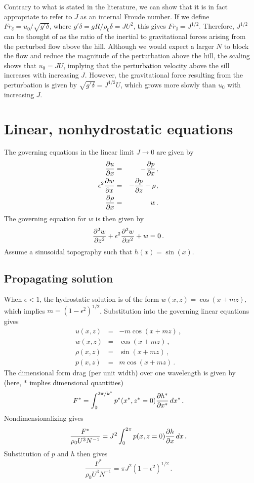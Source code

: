 \documentclass[12pt]{article}
\begin{document}
Contrary to what is stated in the literature, we can show that it is
in fact appropriate to refer to $J$ as an internal Froude number. If we define
$Fr_\delta = u_0/\sqrt{g' \delta}$, where $g'\delta =g R/\rho_0 \delta = J U^2$, this gives
$Fr_{\delta} = J^{1/2}$. Therefore, $J^{1/2}$ can be thought of as 
the ratio of the inertial to gravitational forces arising from the perturbed
flow above the hill. Although we would expect a larger $N$ to block the flow and
reduce the magnitude of the perturbation above the hill, the scaling shows that
$u_0 = J U$, implying that the perturbation velocity above the sill increases with
increasing $J$. However, the gravitational force resulting from the perturbation is
given by $\sqrt{g'\delta} = J^{1/2} U$, which grows more slowly than $u_0$ with
increasing $J$.

\section{Linear, nonhydrostatic equations}

The governing equations in the linear limit $J\to 0$ are given by
\begin{eqnarray*}
\frac{\partial{u}}{\partial{x}} &=& -\frac{\partial{p}}{\partial{x}}\,,\\
\epsilon^2 \frac{\partial{w}}{\partial{x}} &=& -\frac{\partial{p}}{\partial{z}} - \rho\,,\\
\frac{\partial{\rho}}{\partial{x}} &=& w\,.
\end{eqnarray*}
The governing equation for $w$ is then given by
\[ 
\frac{\partial^{2}{w}}{\partial{z}^{2}} + \epsilon^2 \frac{\partial^{2}{w}}{\partial{x}^{2}} + w = 0\,.
\]
Assume a sinusoidal topography such that $h(x) = \sin(x)$.

\subsection{Propagating solution}

When $\epsilon<1$, the hydrostatic solution is of the form
$w(x,z) = \cos(x + m z)$, which implies $m = (1-\epsilon^2)^{1/2}$.  Substitution into
the governing linear equations gives
\begin{eqnarray*}
u(x,z) &=& -m \cos(x + m z)\,,\\
w(x,z) &=& \cos(x + m z)\,,\\
\rho(x,z) &=& \sin(x + m z)\,,\\
p(x,z) &=& m \cos(x + m z)\,.
\end{eqnarray*}
The dimensional form drag (per unit width) over one wavelength is given by (here, $*$ implies dimensional
quantities)
\[
F^* = \int_{0}^{2\pi/k^*} p^*(x^*,z^*=0)\frac{\partial{h^*}}{\partial{x^*}}\, dx^*\,.
\]
Nondimensionalizing gives
\[
\frac{F^*}{\rho_0 U^3 N^{-1}} = J^2 \int_{0}^{2\pi} p(x,z=0)\frac{\partial{h}}{\partial{x}}\, dx\,.
\]
Substitution of $p$ and $h$ then gives
\[
\frac{F^*}{\rho_0 U^3 N^{-1}} = \pi J^2\left(1 - \epsilon^2\right)^{1/2}\,.
\]
\end{document}
